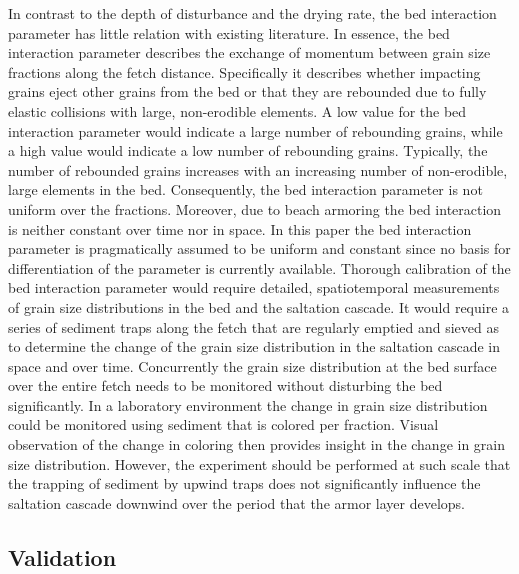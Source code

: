 In contrast to the depth of disturbance and the drying rate, the bed
interaction parameter has little relation with existing literature. In
essence, the bed interaction parameter describes the exchange of
momentum between grain size fractions along the fetch
distance. Specifically it describes whether impacting grains eject
other grains from the bed or that they are rebounded due to fully
elastic collisions with large, non-erodible elements. A low value for
the bed interaction parameter would indicate a large number of
rebounding grains, while a high value would indicate a low number of
rebounding grains. Typically, the number of rebounded grains increases
with an increasing number of non-erodible, large elements in the
bed. Consequently, the bed interaction parameter is not uniform over
the fractions. Moreover, due to beach armoring the bed interaction is
neither constant over time nor in space. In this paper the bed
interaction parameter is pragmatically assumed to be uniform and
constant since no basis for differentiation of the parameter is
currently available. Thorough calibration of the bed interaction
parameter would require detailed, spatiotemporal measurements of grain
size distributions in the bed and the saltation cascade. It would
require a series of sediment traps along the fetch that are regularly
emptied and sieved as to determine the change of the grain size
distribution in the saltation cascade in space and over
time. Concurrently the grain size distribution at the bed surface over
the entire fetch needs to be monitored without disturbing the bed
significantly. In a laboratory environment the change in grain size
distribution could be monitored using sediment that is colored per
fraction. Visual observation of the change in coloring then provides
insight in the change in grain size distribution. However, the
experiment should be performed at such scale that the trapping of
sediment by upwind traps does not significantly influence the
saltation cascade downwind over the period that the armor layer
develops.

\subsection{Validation}


